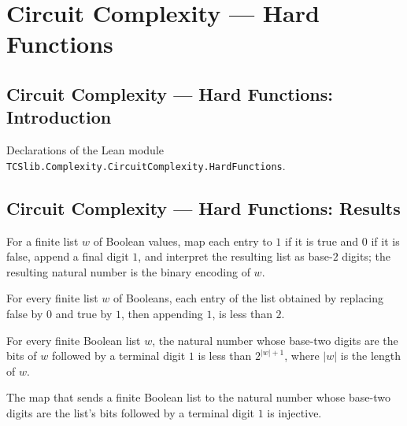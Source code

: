\section{Circuit Complexity --- Hard Functions}
\subsection*{Circuit Complexity --- Hard Functions: Introduction}

Declarations of the Lean module \texttt{TCSlib.Complexity.CircuitComplexity.HardFunctions}.

\subsection*{Circuit Complexity --- Hard Functions: Results}

\begin{definition}
\label{BoolCircuit.bitsToNat}
\leanok
For a finite list $w$ of Boolean values, map each entry to $1$ if it is true and $0$ if
it is false, append a final digit $1$, and interpret the resulting list as base-$2$
digits; the resulting natural number is the binary encoding of $w$.
\end{definition}

\begin{theorem}
\label{BoolCircuit.bitsToNat_digits_lt}
\leanok
{}
For every finite list $w$ of Booleans, each entry of the list obtained by replacing
false by $0$ and true by $1$, then appending $1$, is less than $2$.
\end{theorem}

\begin{theorem}
\label{BoolCircuit.bitsToNat_lt}
\leanok
{}
For every finite Boolean list $w$, the natural number whose base-two digits are the bits
of $w$ followed by a terminal digit $1$ is less than $2^{|w|+1}$, where $|w|$ is the
length of $w$.
\end{theorem}

\begin{theorem}
\label{BoolCircuit.bitsToNat_injective}
\leanok
{}
The map that sends a finite Boolean list to the natural number whose base-two digits are
the list’s bits followed by a terminal digit $1$ is injective.
\end{theorem}

